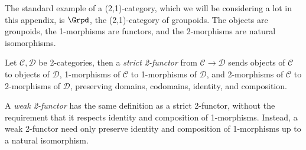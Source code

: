 \begin{example}
The standard example of a (2,1)-category, which we will be considering a lot in this appendix, is $\Grpd$, the (2,1)-category of groupoids. The objects are groupoids, the 1-morphisms are functors, and the 2-morphisms are natural isomorphisms. 
\end{example}
\begin{definition}
Let $\mathcal{C}, \mathcal{D}$ be 2-categories, then a \emph{strict 2-functor} from $\mathcal{C} \to \mathcal{D}$ sends objects of $\mathcal{C}$ to objects of $\mathcal{D}$, 1-morphisms of $\mathcal{C}$ to 1-morphisms of $\mathcal{D}$, and 2-morphisms of $\mathcal{C}$ to 2-morphisms of $\mathcal{D}$, preserving domains, codomains, identity, and composition.
\end{definition}
\begin{definition}
A \emph{weak 2-functor} has the same definition as a strict 2-functor, without the requirement that it respects identity and composition of 1-morphisms. Instead, a weak 2-functor need only preserve identity and composition of 1-morphisms up to a natural isomorphism.
\end{definition}
